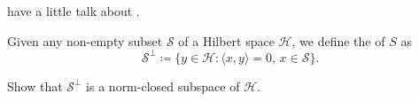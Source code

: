 \documentclass[notoc,notitlepage]{tufte-book}
\begin{document}
 have a little talk about .

\begin{defn}\label{defn:perpendicular_space}
  Given any non-empty subset $\mathcal{S}$ of a Hilbert space $\mathcal{H}$,
  we define the  of $S$ as
  \begin{equation*}
    \mathcal{S}^{\perp}
    \coloneqq \{ y \in \mathcal{H} : \langle x, y \rangle = 0,\, x \in \mathcal{S} \}.
  \end{equation*}
\end{defn}

\begin{ex}\label{ex:perp_space_is_closed}
  Show that $\mathcal{S}^{\perp}$ is a norm-closed subspace
  of $\mathcal{H}$.
\end{ex}
\end{document}
